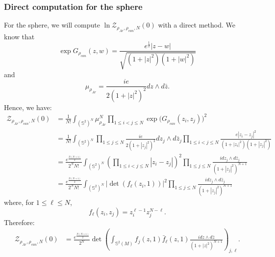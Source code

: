 \documentclass{article}
\theoremstyle{definition}
\theoremstyle{remark}
\begin{document}
\subsubsection{Direct computation for the sphere}\label{DirectSphere}
For the sphere, we will compute $\ln\mathcal{Z}_{\rho_{Ar},\rho_{can},N}(0)$ with a direct method. We know that $$\exp G_{\rho_{can}}(z,w)=\frac{e^{\frac{1}{2}}|z-w|}{\sqrt{(1+|z|^{2})(1+|w|^{2})}}$$ and $$\mu_{\rho_{Ar}}=\frac{ie}{2(1+|z|^{2})^{2}}dz\wedge d\bar{z}.$$ Hence, we have: 
\begin{align*}
    \mathcal{Z}_{\rho_{Ar},\rho_{can},N}(0)&=\frac{1}{N!}\int_{(\mathbb{S}^{2})^{N}}\mu_{\rho_{Ar}}^{N}\prod_{1\leq i<j\leq N}\exp \Big(G_{\rho_{can}}(z_{i},z_{j})\Big)^{2} \\&=\frac{1}{N!}\int_{(\mathbb{S}^{2})^{N}}\prod_{1\leq j\leq N}\frac{ie}{2(1+|z_{j}|^{2})^{2}}dz_{j}\wedge d\bar{z}_{j} \prod_{1\leq i<j \leq N}\frac{e|z_{i}-z_{j}|^{2}}{(1+|z_{i}|^{2})(1+|z_{j}|^{2})}\\&=\frac{e^{\frac{N(N+1)}{2}}}{2^{N}N!}\int_{(\mathbb{S}^{2})^{N}}\left(\prod_{1\leq i<j \leq N}|z_{i}-z_{j}| \right)^{2}\prod_{1\leq j \leq N} \frac{idz_{j}\wedge d\bar{z}_{j}}{(1+|z_{j}|^{2})^{N+1}} \\&=\frac{e^{\frac{N(N+1)}{2}}}{2^{N}N!}\int_{(\mathbb{S}^{2})^{N}}\left|\det (f_{\ell}(z_{i},1)) \right|^{2}\prod_{1\leq j \leq N} \frac{idz_{j}\wedge d\bar{z}_{j}}{(1+|z_{j}|^{2})^{N+1}}
\end{align*}
where, for $1\leq \ell\leq N$, $$f_{\ell}(z_{i},z_{j})=z_{i}^{\ell-1}z_{j}^{N-\ell}.$$
Therefore: \begin{align*}
    \mathcal{Z}_{\rho_{Ar},\rho_{can},N}(0)&=\frac{e^{\frac{N(N+1)}{2}}}{2^{N}}\det\left(\int_{\mathbb{S}^{2}(M)}f_{j}(z,1)\bar{f}_{\ell}(z,1)\frac{id z\wedge d\bar{z}}{(1+|z|^{2})^{N+1}} \right)_{j,\ell}.
\end{align*}
\end{document}
